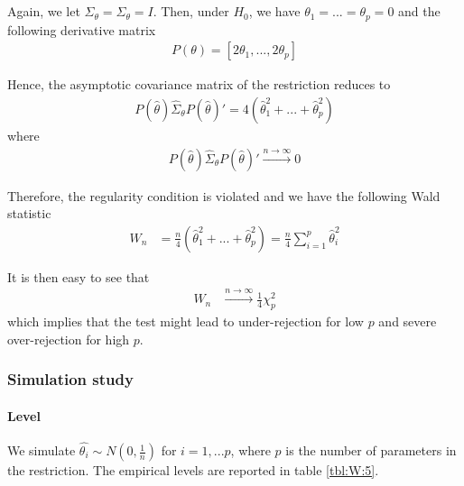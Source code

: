 \documentclass[11pt]{article}\usepackage[]{graphicx}\usepackage[]{color}
\begin{document}
Again, we let $\hat{\Sigma}_\theta=\Sigma_\theta=I$. Then, under $H_0$, we have $\theta_1=...=\theta_p=0$ and the following derivative matrix
\begin{align}
	P(\theta) = \left[2\theta_1, ... , 2\theta_p \right]
\end{align}

Hence, the asymptotic covariance matrix of the restriction reduces to
\begin{align}
	P(\hat{\theta})\hat{\Sigma}_\theta P(\hat{\theta})' = 4(\hat{\theta}_1^2+...+\hat{\theta}_p^2)
\end{align}
where
\begin{align}
	P(\hat{\theta})\hat{\Sigma}_\theta P(\hat{\theta})'\xrightarrow{n \rightarrow \infty} 0
\end{align}

Therefore, the regularity condition is violated and we have the following Wald statistic
\begin{align}
	W_n & = \frac{n}{4}( \hat{\theta}_1^2 + ... + \hat{\theta}_p^2) = \frac{n}{4} \sum_{i=1}^{p}\hat{\theta}_i^2
\end{align}

It is then easy to see that
\begin{align}
	W_n & \xrightarrow{n \rightarrow \infty}\frac{1}{4} \chi^2_p
\end{align}
which implies that the test might lead to under-rejection for low $p$ and severe over-rejection for high $p$.

\subsubsection{Simulation study}
\paragraph{Level}

We simulate $\hat{\theta_i} \sim N(0,\frac{1}{n})$ for $i=1,...p$, where $p$ is the number of parameters in the restriction. The empirical levels are reported in table \ref{tbl:W:5}.
\end{document}
